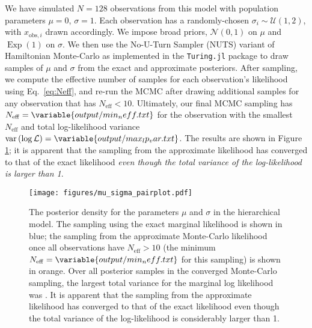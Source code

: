 \documentclass[modern]{aastex631}
\newcommand{\Neff}{N_{\mathrm{eff}}}
\DeclareMathOperator{\Exp}{Exp}
\DeclareMathOperator{\var}{var}
\begin{document}
We have simulated $N = 128$ observations from this model with population
parameters $\mu = 0$, $\sigma = 1$.  Each observation has a randomly-chosen
$\sigma_i \sim \mathcal{U}(1, 2)$, with $x_{\mathrm{obs},i}$ drawn accordingly.
We impose broad priors, $\mathcal{N}(0,1)$ on $\mu$ and $\Exp(1)$ on $\sigma$.
We then use the No-U-Turn Sampler (NUTS) \citep{Hoffman2011} variant of
Hamiltonian Monte-Carlo \citep{Neal2011} as implemented in the
\texttt{Turing.jl} package \citep{Ge2018} to draw samples of $\mu$ and $\sigma$
from the exact and approximate posteriors.  After sampling, we compute the
effective number of samples for each observation's likelihood using Eq.\
\eqref{eq:Neff}, and re-run the MCMC after drawing additional samples for any
observation that has $\Neff < 10$.  Ultimately, our final MCMC sampling has
$\Neff = \variable{output/min_neff.txt}$ for the observation with the smallest
$\Neff$ and total log-likelihood variance $\var\left( \log \mathcal{L} \right) =
\variable{output/max_lp_var.txt}$. The results are shown in Figure
\ref{fig:mu-sigma}; it is apparent that the sampling from the approximate
likelihood has converged to that of the exact likelihood \emph{even though the
total variance of the log-likelihood is larger than 1}.  

\begin{figure}
    \texttt{[image: figures/mu\_sigma\_pairplot.pdf]}
    \caption{\label{fig:mu-sigma} The posterior density for the parameters $\mu$
    and $\sigma$ in the hierarchical model.  The sampling using the exact
    marginal likelihood is shown in blue; the sampling from the approximate
    Monte-Carlo likelihood once all observations have $\Neff > 10$ (the minimum
    $\Neff = \variable{output/min_neff.txt}$ for this sampling) is shown in
    orange. Over all posterior samples in the converged Monte-Carlo sampling,
    the largest total variance for the marginal log likelihood was
    \variable{output/max_lp_var.txt}.  It is apparent that the sampling from the
    approximate likelihood has converged to that of the exact likelihood even
    though the total variance of the log-likelihood is considerably larger than
    1.}
\end{figure}


\end{document}
